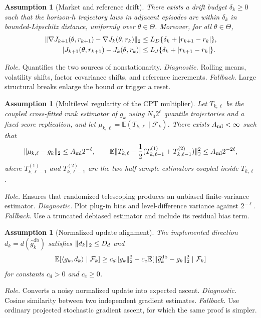 \documentclass[11pt]{article}
\newtheorem{assumption}[theorem]{Assumption}
\newcommand{\E}{\mathbb E}
\newcommand{\1}{\mathbf 1}
\DeclarePairedDelimiter{\abs}{\lvert}{\rvert}
\DeclarePairedDelimiter{\norm}{\lVert}{\rVert}
\DeclarePairedDelimiter{\ip}{\langle}{\rangle}
\newcommand{\cF}{\mathcal F}
\newcommand{\ThetaSet}{\Theta}
\newcommand{\db}{\mathrm{db}}
\begin{document}
\begin{assumption}[Market and reference drift]\label{ass:drift}
There exists a drift budget $\delta_k\ge0$ such that the horizon-$h$ trajectory laws in adjacent episodes are within $\delta_k$ in bounded-Lipschitz distance, uniformly over $\theta\in\ThetaSet$.  Moreover, for all $\theta\in\ThetaSet$,
\begin{align}
 \norm{\nabla J_{k+1}(\theta,r_{k+1})-\nabla J_k(\theta,r_k)}_2
 &\le L_D\{\delta_k+\abs{r_{k+1}-r_k}\},\label{eq:gradient-drift}\\
 \abs{J_{k+1}(\theta,r_{k+1})-J_k(\theta,r_k)}
 &\le L_J\{\delta_k+\abs{r_{k+1}-r_k}\}.
 \label{eq:value-drift}
\end{align}
\end{assumption}
\emph{Role.}  Quantifies the two sources of nonstationarity.  \emph{Diagnostic.}  Rolling means, volatility shifts, factor covariance shifts, and reference increments.  \emph{Fallback.}  Large structural breaks enlarge the bound or trigger a reset.

\begin{assumption}[Multilevel regularity of the CPT multiplier]\label{ass:mlmc}
Let $T_{k,\ell}$ be the coupled cross-fitted rank estimator of $g_k$ using $N_0 2^\ell$ quantile trajectories and a fixed score replication, and let $\mu_{k,\ell}=\E(T_{k,\ell}\mid\cF_k)$.  There exists $A_{\rm ml}<\infty$ such that
\[
 \norm{\mu_{k,\ell}-g_k}_2\le A_{\rm ml}2^{-\ell},\qquad
 \E\norm{T_{k,\ell}-{1\over2}(T_{k,\ell-1}^{(1)}+T_{k,\ell-1}^{(2)})}_2^2\le A_{\rm ml}2^{-2\ell},
\]
where $T_{k,\ell-1}^{(1)}$ and $T_{k,\ell-1}^{(2)}$ are the two half-sample estimators coupled inside $T_{k,\ell}$.
\end{assumption}
\emph{Role.}  Ensures that randomized telescoping produces an unbiased finite-variance estimator.  \emph{Diagnostic.}  Plot plug-in bias and level-difference variance against $2^{-\ell}$.  \emph{Fallback.}  Use a truncated debiased estimator and include its residual bias term.

\begin{assumption}[Normalized update alignment]\label{ass:alignment}
The implemented direction $d_k=d(\widehat g_k^{\db})$ satisfies $\norm{d_k}_2\le D_d$ and
\begin{equation}\label{eq:alignment}
 \E[\ip{g_k,d_k}\mid\cF_k]
 \ge c_d\norm{g_k}_2^2-c_e\E[\norm{\widehat g_k^{\db}-g_k}_2^2\mid\cF_k]
\end{equation}
for constants $c_d>0$ and $c_e\ge0$.
\end{assumption}
\emph{Role.}  Converts a noisy normalized update into expected ascent.  \emph{Diagnostic.}  Cosine similarity between two independent gradient estimates.  \emph{Fallback.}  Use ordinary projected stochastic gradient ascent, for which the same proof is simpler.
\end{document}

